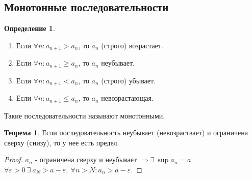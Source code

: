 \documentclass[a4paper, 12pt]{article}
\renewcommand{\epsilon}{\varepsilon}
\newcommand\tab[1][.5cm]{\hspace*{#1}}
\theoremstyle{definition}
\newtheorem*{definition}{Определение}
\newtheorem*{theorem}{Теорема}
\begin{document}
        \subsection{Монотонные последовательности}
        \begin{definition} \tab
            \begin{enumerate}
                \item Если $\forall n: a_{n+1}>a_n$, то $a_n$ (строго) возрастает.
                \item Если $\forall n: a_{n+1}\geq a_n$, то $a_n$ неубывает.
                \item Если $\forall n: a_{n+1}<a_n$, то $a_n$ (строго) убывает.
                \item Если $\forall n: a_{n+1}\leq a_n$, то $a_n$ невозрастающая.
            \end{enumerate}
            Такие последовательности называют монотонными.
        \end{definition} 
        \begin{theorem}
            Если последовательность неубывает (невозраствает) и ограничена сверху (снизу), то у нее есть предел.
        \end{theorem}
        \begin{proof}
            $a_n$ - ограничена сверху и неубывает $\Rightarrow \exists\ \sup a_n=a$.\\ $\forall \epsilon>0\ \exists\ a_N>a-\epsilon,\ \forall n>N: a_n>a-\epsilon$.
        \end{proof}  
\end{document}
